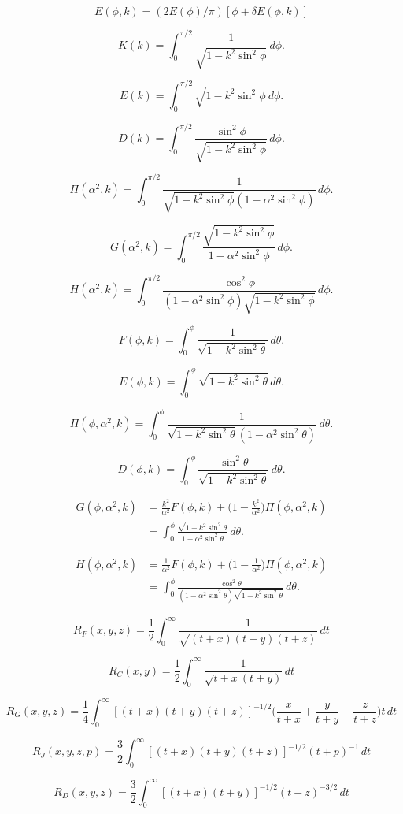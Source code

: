 \documentclass{article}
\begin{document}
\[ E(\phi, k) = (2 E(\phi) / \pi) [ \phi + \delta E(\phi, k) ] \]
\pagebreak

\[ K(k) = \int_0^{\pi/2} \frac1{\sqrt{1-k^2\sin^2\phi}}\,d\phi. \]
\pagebreak

\[ E(k) = \int_0^{\pi/2} \sqrt{1-k^2\sin^2\phi}\,d\phi. \]
\pagebreak

\[ D(k) = \int_0^{\pi/2} \frac{\sin^2\phi}{\sqrt{1-k^2\sin^2\phi}}\,d\phi. \]
\pagebreak

\[ \Pi(\alpha^2, k) = \int_0^{\pi/2} \frac1{\sqrt{1-k^2\sin^2\phi}(1 - \alpha^2\sin^2\phi)}\,d\phi. \]
\pagebreak

\[ G(\alpha^2, k) = \int_0^{\pi/2} \frac{\sqrt{1-k^2\sin^2\phi}}{1 - \alpha^2\sin^2\phi}\,d\phi. \]
\pagebreak

\[ H(\alpha^2, k) = \int_0^{\pi/2} \frac{\cos^2\phi}{(1-\alpha^2\sin^2\phi)\sqrt{1-k^2\sin^2\phi}} \,d\phi. \]
\pagebreak

\[ F(\phi, k) = \int_0^\phi \frac1{\sqrt{1-k^2\sin^2\theta}}\,d\theta. \]
\pagebreak

\[ E(\phi, k) = \int_0^\phi \sqrt{1-k^2\sin^2\theta}\,d\theta. \]
\pagebreak

\[ \Pi(\phi, \alpha^2, k) = \int_0^\phi \frac1{\sqrt{1-k^2\sin^2\theta}(1 - \alpha^2\sin^2\theta)}\,d\theta. \]
\pagebreak

\[ D(\phi, k) = \int_0^\phi \frac{\sin^2\theta}{\sqrt{1-k^2\sin^2\theta}}\,d\theta. \]
\pagebreak

\[ \begin{align} G(\phi, \alpha^2, k) &= \frac{k^2}{\alpha^2} F(\phi, k) + \biggl(1 - \frac{k^2}{\alpha^2}\biggr) \Pi(\phi, \alpha^2, k) \\ &= \int_0^\phi \frac{\sqrt{1-k^2\sin^2\theta}}{1 - \alpha^2\sin^2\theta}\,d\theta. \end{align} \]
\pagebreak

\[ \begin{align} H(\phi, \alpha^2, k) &= \frac1{\alpha^2} F(\phi, k) + \biggl(1 - \frac1{\alpha^2}\biggr) \Pi(\phi, \alpha^2, k) \\ &= \int_0^\phi \frac{\cos^2\theta}{(1-\alpha^2\sin^2\theta)\sqrt{1-k^2\sin^2\theta}} \,d\theta. \end{align} \]
\pagebreak

\[ R_F(x, y, z) = \frac12 \int_0^\infty\frac1{\sqrt{(t + x) (t + y) (t + z)}}\, dt \]
\pagebreak

\[ R_C(x, y) = \frac12 \int_0^\infty\frac1{\sqrt{t + x}(t + y)}\,dt \]
\pagebreak

\[ R_G(x, y, z) = \frac14 \int_0^\infty[(t + x) (t + y) (t + z)]^{-1/2} \biggl( \frac x{t + x} + \frac y{t + y} + \frac z{t + z} \biggr)t\,dt \]
\pagebreak

\[ R_J(x, y, z, p) = \frac32 \int_0^\infty[(t + x) (t + y) (t + z)]^{-1/2} (t + p)^{-1}\, dt \]
\pagebreak

\[ R_D(x, y, z) = \frac32 \int_0^\infty[(t + x) (t + y)]^{-1/2} (t + z)^{-3/2}\, dt \]
\pagebreak
\end{document}
